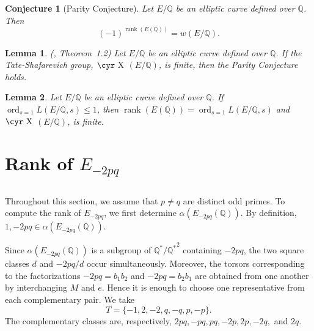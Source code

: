 \documentclass[12pt]{amsart}
\newcommand{\bbQ}{\mathbb{Q}}
\newcommand{\Sha}{\hbox{\cyr X}}
\DeclareMathOperator{\ord}{ord}
\DeclareMathOperator{\rank}{rank}
\numberwithin{equation}{section}
\newtheorem{lem}{Lemma}[section]
\newtheorem{conj}[theorem]{Conjecture}
\theoremstyle{definition}
\begin{document}
\begin{conj}[Parity Conjecture]
\label{conj:parity}
Let $E/\bbQ$ be an elliptic curve defined over $\bbQ$. Then
\[
(-1)^{\rank(E(\bbQ))}=w(E/\bbQ).
\]
\end{conj}

\begin{lem}
\label{lem:parity}(\cite{D-D},  Theorem~1.2)
Let $E/\bbQ$ be an elliptic curve defined over $\bbQ$. If the Tate-Shafarevich
group, $\Sha$ $(E/\bbQ)$, is finite, then the Parity Conjecture holds.
\end{lem}


\begin{lem}
\label{lem:kolyvagin}
Let $E/\bbQ$ be an elliptic curve defined over $\bbQ$. If
$\ord_{s=1}L(E/\bbQ,s) \leq 1$, then $\rank(E(\bbQ))=\ord_{s=1}L(E/\bbQ,s)$ and  $\Sha$ $(E/\bbQ)$, is finite.
\end{lem}




\section{\texorpdfstring{Rank of $E_{-2pq}$}{Rank of E_{-2pq}}}

\subsection{}


Throughout this section, we assume that $p\neq q$ are distinct odd primes. To
compute the rank of $E_{-2pq}$, we first determine
$\alpha(E_{-2pq}(\bbQ))$. By definition,
$1,-2pq\in\alpha(E_{-2pq}(\bbQ))$.

Since $\alpha(E_{-2pq}(\bbQ))$ is a subgroup of
$\bbQ^*/{\bbQ^*}^2$ containing $-2pq$, the two square classes $d$ and
$-2pq/d$ occur simultaneously. Moreover, the torsors corresponding to the
factorizations $-2pq=b_1b_2$ and $-2pq=b_2b_1$ are obtained from one another
by interchanging $M$ and $e$. Hence it is enough to choose one representative
from each complementary pair. We take
\[
T=\{-1,2,-2,q,-q,p,-p\}.
\]
The complementary classes are, respectively,
$2pq,-pq,pq,-2p,2p,-2q,$ and $2q$.
\end{document}
